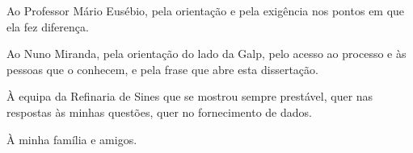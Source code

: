 
%

\begin{ntacknowledgements}

Ao Professor Mário Eusébio, pela orientação e pela exigência nos pontos
em que ela fez diferença.

Ao Nuno Miranda, pela orientação do lado da Galp, pelo acesso ao
processo e às pessoas que o conhecem, e pela frase que abre esta
dissertação.

À equipa da Refinaria de Sines que se mostrou sempre prestável, quer nas
respostas às minhas questões, quer no fornecimento de dados.

À minha família e amigos.

\end{ntacknowledgements}
